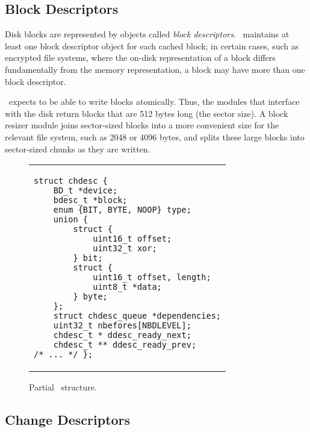 
\subsection{Block Descriptors}

Disk blocks are represented by objects called \emph{block descriptors}.
%
\Kudos\ maintains at least one block descriptor object for each cached
 block; in certain cases, such as encrypted file systems, where the on-disk
 representation of a block differs fundamentally from the memory
 representation, a block may have more than one block descriptor.


\Kudos\ expects to be able to write blocks atomically.
%
Thus, the modules that interface with the disk return blocks that are 512
 bytes long (the sector size).
%
A block resizer module joins sector-sized blocks into a more convenient
 size for the relevant file system, such as 2048 or 4096 bytes, and splits
 these large blocks into sector-sized chunks as they are written.


\begin{figure}[t]
\vskip-14pt
\begin{tabular}{@{\hskip0.58in}p{2in}@{}}
\begin{scriptsize}
\begin{verbatim}
struct chdesc {
    BD_t *device;
    bdesc_t *block;
    enum {BIT, BYTE, NOOP} type;
    union {
        struct {
            uint16_t offset;
            uint32_t xor;
        } bit;
        struct {
            uint16_t offset, length;
            uint8_t *data;
        } byte;
    };
    struct chdesc_queue *dependencies;
    uint32_t nbefores[NBDLEVEL];
    chdesc_t * ddesc_ready_next;
    chdesc_t ** ddesc_ready_prev;
/* ... */ };
\end{verbatim}
\end{scriptsize}
\end{tabular}
\vspace{-10pt}
\caption{\label{fig:chdesc} Partial \chdesc\ structure.}
\end{figure}


\subsection {Change Descriptors}
\label{sec:design:chdescs}



